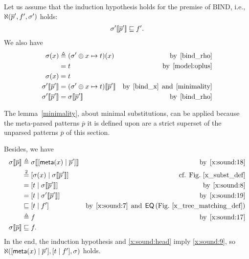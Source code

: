 \begin{enumerate}
\begin{enumerate}
        \end{enumerate}
        Let us assume that the induction hypothesis holds for the
        premise of \textsf{BIND}, i.e., \(\ind{R}(\overline{p}', f',
        \sigma')\) holds:
        \begin{gather}
          \subst{\overline{p}'}{\sigma'} \sqsubseteq f'.
          \label{x:sound:7}
        \end{gather}
        We also have
        \begin{align}
           \sigma(x) 
          &\triangleq (\sigma' \oplus x \mapsto t)(x)
          &\text{by} \,\; \text{\ref{bind_rho}}\notag\\
          &= t
          &\text{by} \,\; \eqref{model:oplus}\notag\\
           \sigma(x)
          &= t \label{x:sound:8}\\
           \subst{\overline{p}'}{\sigma'}
           &= \subst{\overline{p}'}{(\sigma' \oplus x \mapsto t)}
           &\text{by} \,\; \text{\ref{bind_x}} \,\; \text{and} \,\;
           \text{\ref{minimality}}\notag\\
           \subst{\overline{p}'}{\sigma'}
           &= \subst{\overline{p}'}{\sigma}
           &\text{by} \,\; \text{\ref{bind_rho}} \label{x:sound:19}
        \end{align}
        \begin{remark}
          The lemma~\ref{minimality}, about minimal substitutions, can
          be applied because the meta\hyp{}parsed patterns
          \(\overline{p}\) it is defined upon are a strict superset of
          the unparsed patterns \(\overline{p}\) of this section.
        \end{remark}
        Besides, we have
        \begin{align}
           \subst{\overline{p}}{\sigma}
        &\triangleq \subst{\cons{\meta{x}}{\overline{p}'}}{\sigma}
        &\text{by} \,\; \text{\ref{x:sound:18}}\notag\\
        &\eqn{2} \cons{\sigma(x)}{\subst{\overline{p}'}{\sigma}}\notag
        &\text{cf. Fig.~\ref{x_subst_def}}\\
        &= \cons{t}{\subst{\overline{p}'}{\sigma}}
        &\text{by} \,\; \eqref{x:sound:8}\notag\\
        &= \cons{t}{\subst{\overline{p}'}{\sigma'}}
        &\text{by} \,\; \eqref{x:sound:19}\notag\\
        &\sqsubseteq \cons{t}{f'}
        &\text{by} \,\; \eqref{x:sound:7} \,\; \text{and} \,\;
           \textsf{EQ} \, \text{(Fig.~\ref{x_tree_matching_def})}\notag\\
        &\triangleq f
        &\text{by} \,\; \text{\ref{x:sound:17}}\notag\\
           \subst{\overline{p}}{\sigma}
        &\sqsubseteq f. \label{x:sound:9}
        \end{align}
        In the end, the induction hypothesis and \eqref{x:sound:head}
        imply \eqref{x:sound:9}, so
        \(\ind{R}(\cons{\meta{x}}{\overline{p}'}, \cons{t}{f'},
        \sigma)\) holds.


\end{enumerate}
